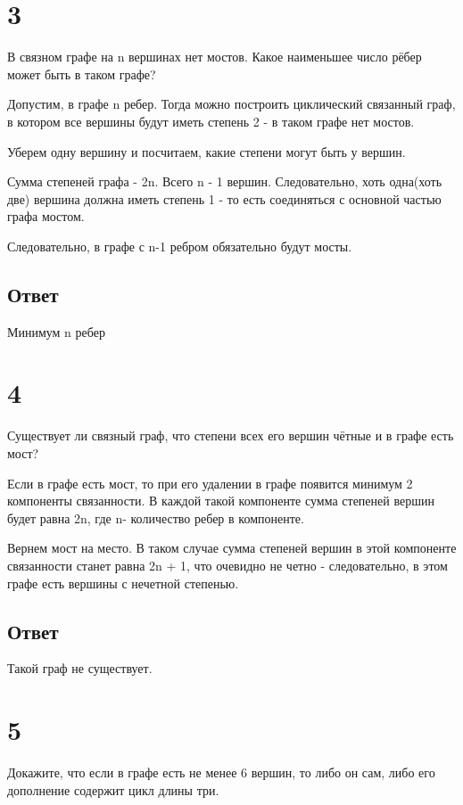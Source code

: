 \documentclass[a4paper]{article}
\begin{document}
\section*{3}
В связном графе на n вершинах нет мостов. Какое наименьшее число рёбер
может быть в таком графе?

Допустим, в графе n ребер. Тогда можно построить циклический связанный граф, в котором все вершины будут иметь степень 2 - в таком графе нет мостов.

Уберем одну вершину и посчитаем, какие степени могут быть у вершин.

Сумма степеней графа - 2n. Всего n - 1 вершин. Следовательно, хоть одна(хоть две) вершина должна иметь степень 1 - то есть соединяться с основной частью графа мостом.

Следовательно, в графе с n-1 ребром обязательно будут мосты.

\subsection*{Ответ}
Минимум n ребер

\section*{4}
Существует ли связный граф, что степени всех его вершин чётные и в графе
есть мост?


Если в графе есть мост, то при его удалении в графе появится минимум 2 компоненты связанности. В каждой такой компоненте сумма степеней вершин будет равна 2n, где n- количество ребер в компоненте.

Вернем мост на место. В таком случае сумма степеней вершин в этой компоненте связанности станет равна 2n + 1, что очевидно не четно - следовательно, в этом графе есть вершины с нечетной степенью.

\subsection*{Ответ}
Такой граф не существует.

\section*{5}

Докажите, что если в графе есть не менее 6 вершин, то либо он сам, либо его
дополнение содержит цикл длины три.
\end{document}
